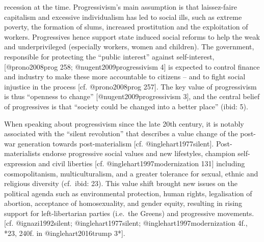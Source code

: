 \documentclass[]{article}
\begin{document}
recession at the time. Progressivism's main assumption is that
laissez-faire capitalism and excessive individualism has led to social
ills, such as extreme poverty, the formation of slums, increased
prostitution and the exploitation of workers. Progressives hence support
state induced social reforms to help the weak and underprivileged
(especially workers, women and children). The government, responsible
for protecting the ``public interest'' against self-interest,
{[}@prono2008prog 258; @nugent2009progressivism 4{]} is expected to
control finance and industry to make these more accountable to citizens
-- and to fight social injustice in the process {[}cf. @prono2008prog
257{]}. The key value of progressivism is thus ``openness to change''
{[}@nugent2009progressivism 3{]}, and the central belief of progressives
is that ``society could be changed into a better place'' (ibid: 5).

When speaking about progressivism since the late 20th century, it is
notably associated with the ``silent revolution'' that describes a value
change of the post-war generation towards post-materialism {[}cf.
@inglehart1977silent{]}. Post-materialists endorse progressive social
values and new lifestyles, champion self-expression and civil liberties
{[}cf. @inglehart1997modernization 131{]} including cosmopolitanism,
multiculturalism, and a greater tolerance for sexual, ethnic and
religious diversity (cf.~ibid: 23). This value shift brought new issues
on the political agenda such as environmental protection, human rights,
legalisation of abortion, acceptance of homosexuality, and gender
equity, resulting in rising support for left-libertarian parties
(i.e.~the Greens) and progressive movements. {[}cf. @ignazi1992silent;
@inglehart1977silent; @inglehart1997modernization 4f., *23, 240f. in
@inglehart2016trump 3*{]}.
\end{document}
